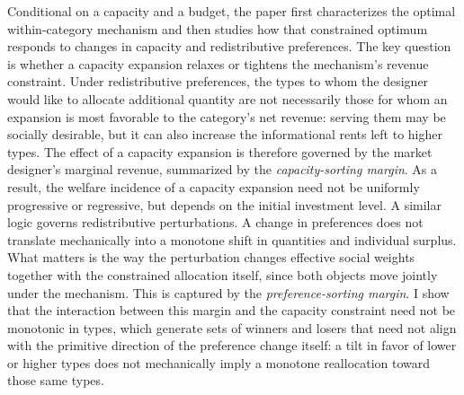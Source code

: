 \documentclass{class}
\begin{document}
Conditional on a capacity and a budget, the paper first characterizes the optimal within-category mechanism and then studies how that constrained optimum responds to changes in capacity and redistributive preferences. The key question is whether a capacity expansion relaxes or tightens the mechanism’s revenue constraint. Under redistributive preferences, the types to whom the designer would like to allocate additional quantity are not necessarily those for whom an expansion is most favorable to the category’s net revenue: serving them may be socially desirable, but it can also increase the informational rents left to higher types. The effect of a capacity expansion is therefore governed by the market designer’s marginal revenue, summarized by the \textit{capacity-sorting margin}. As a result, the welfare incidence of a capacity expansion need not be uniformly progressive or regressive, but depends on the initial investment level. A similar logic governs redistributive perturbations. A change in preferences does not translate mechanically into a monotone shift in quantities and individual surplus. What matters is the way the perturbation changes effective social weights together with the constrained allocation itself, since both objects move jointly under the mechanism. This is captured by the \textit{preference-sorting margin}. I show that the interaction between this margin and the capacity constraint need not be monotonic in types, which generate sets of winners and losers that need not align with the primitive direction of the preference change itself: a tilt in favor of lower or higher types does not mechanically imply a monotone reallocation toward those same types.     
\end{document}

